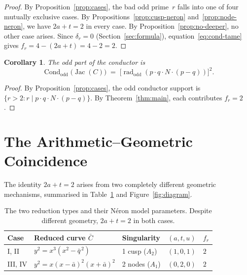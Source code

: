 \documentclass[11pt,a4paper]{article}
\newcommand{\rad}{\operatorname{rad}}
\newcommand{\Jac}{\operatorname{Jac}}
\newcommand{\Cond}{\operatorname{Cond}}
\newtheorem{corollary}[theorem]{Corollary}
\theoremstyle{definition}
\theoremstyle{remark}
\begin{document}
\begin{proof}
  By Proposition~\ref{prop:cases}, the bad odd prime~$r$ falls
  into one of four mutually exclusive cases.
  By Propositions~\ref{prop:cusp-neron} and~\ref{prop:node-neron},
  we have $2a + t = 2$ in every case.
  By Proposition~\ref{prop:no-deeper}, no other case arises.
  Since $\delta_r = 0$ (Section~\ref{sec:formula}),
  equation~\eqref{eq:cond-tame} gives
  $f_r = 4 - (2a + t) = 4 - 2 = 2$.
\end{proof}

\begin{corollary}\label{cor:formula}
  The odd part of the conductor is
  \begin{equation}\label{eq:cond-odd}
    \Cond_{\mathrm{odd}}\bigl(\Jac(C)\bigr)
    \;=\;
    \bigl[\rad_{\mathrm{odd}}(p \cdot q \cdot N
      \cdot (p - q))\bigr]^2.
  \end{equation}
\end{corollary}

\begin{proof}
  By Proposition~\ref{prop:cases}, the odd conductor support is
  $\{r > 2 : r \mid p \cdot q \cdot N \cdot (p - q)\}$.
  By Theorem~\ref{thm:main}, each contributes $f_r = 2$.
\end{proof}


\section{The Arithmetic--Geometric Coincidence}\label{sec:coincidence}

The identity $2a + t = 2$ arises from two completely different
geometric mechanisms, summarised in Table~\ref{tab:summary} and
Figure~\ref{fig:diagram}.

\begin{table}[H]
\centering
\begin{tabular}{lllcl}
\toprule
Case & Reduced curve $\bar{C}$ & Singularity &
$(a,t,u)$ & $f_r$ \\
\midrule
I, II   & $y^2 = x^3(x^2 - \bar{q}^{\,2})$ & 1 cusp ($A_2$)
  & $(1,0,1)$ & $2$ \\
III, IV & $y^2 = x(x{-}\bar{a})^2(x{+}\bar{a})^2$
  & 2 nodes ($A_1$) & $(0,2,0)$ & $2$ \\
\bottomrule
\end{tabular}
\caption{The two reduction types and their N\'eron model
  parameters.  Despite different geometry, $2a + t = 2$
  in both cases.}
\label{tab:summary}
\end{table}
\end{document}
